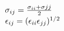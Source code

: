 
\begin{mdframed}
    \vspace*{\baselineskip}
    \centering
    $\molecrad_{ij} = \frac{\molecrad_{ii}+\molecrad{jj}}{2}$\\
    
    $\dielec_{ij} = (\dielec_{ii}\dielec_{jj})^{1/2} $\\
 
\end{mdframed}